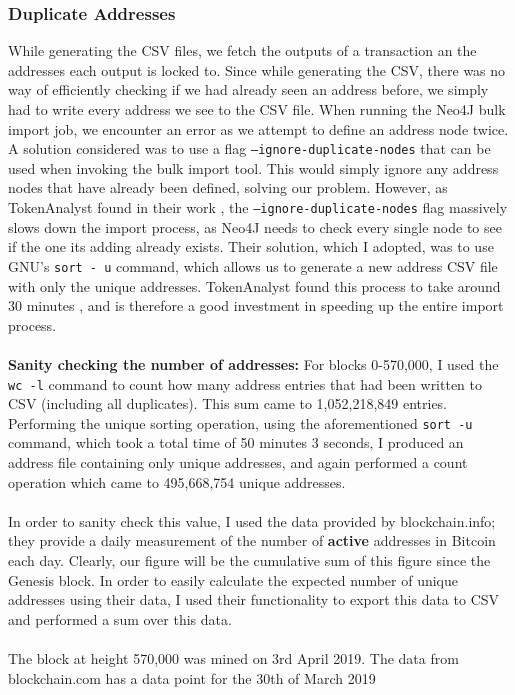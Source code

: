 \subsubsection{Duplicate Addresses}
While generating the CSV files, we fetch the outputs of a transaction an the addresses each output is locked to. Since while generating the CSV, there was no way of efficiently checking if we had already seen an address before, we simply had to write every address we see to the CSV file. When running the Neo4J bulk import job, we encounter an error as we attempt to define an address node twice. A solution considered was to use a flag \texttt{--ignore-duplicate-nodes} that can be used when invoking the bulk import tool. This would simply ignore any address nodes that have already been defined, solving our problem. However, as TokenAnalyst found in their work \cite{RefWorks:doc:5c98e0cde4b044512c0b8641}, the \texttt{--ignore-duplicate-nodes} flag massively slows down the import process, as Neo4J needs to check every single node to see if the one its adding already exists. Their solution, which I adopted, was to use GNU's \texttt{sort - u} command, which allows us to generate a new address CSV file with only the unique addresses. TokenAnalyst found this process to take around 30 minutes \cite{RefWorks:doc:5c98e0cde4b044512c0b8641}, and is therefore a good investment in speeding up the entire import process. 
\\\\
\textbf{Sanity checking the number of addresses: } For blocks 0-570,000, I used the \texttt{wc -l} command to count how many address entries that had been written to CSV (including all duplicates). This sum came to 1,052,218,849 entries. Performing the unique sorting operation, using the aforementioned \texttt{sort -u} command, which took a total time of 50 minutes 3 seconds,  I produced an address file containing only unique addresses, and again performed a count operation which came to 495,668,754 unique addresses.
\\\\
In order to sanity check this value, I used the data provided by blockchain.info; they provide a daily measurement of the number of \textbf{active} addresses in Bitcoin each day. Clearly, our figure will be the cumulative sum of this figure since the Genesis block. In order to easily calculate the expected number of unique addresses using their data, I used their functionality to export this data to CSV and performed a sum over this data. 
\\\\
The block at height 570,000 was mined on 3rd April 2019. The data from blockchain.com has a data point for the 30th of March 2019 

